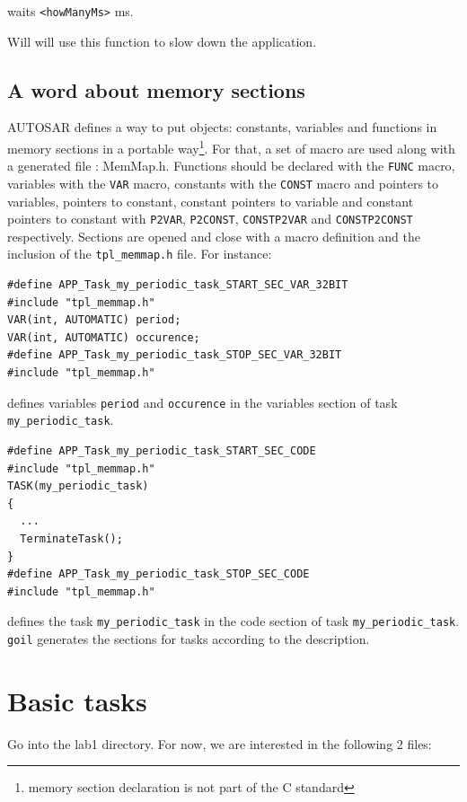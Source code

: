 \documentclass[11pt]{article}
\newcommand{\unixcl}[1]{\texttt{\fcolorbox{black}{gray!20}{#1}}}
\begin{document}
\unixcl{void delay(<howManyMs>);} waits \lstinline{<howManyMs>} ms. 

Will will use this function to slow down the application.

\subsection{A word about memory sections}

AUTOSAR defines a way to put objects: constants, variables and functions in memory sections in a portable way\footnote{memory section declaration is not part of the C standard}. For that, a set of macro are used along with a generated file : MemMap.h. Functions should be declared with the \lstinline{FUNC} macro, variables with the \lstinline{VAR} macro, constants with the \lstinline{CONST} macro and pointers to variables, pointers to constant, constant pointers to variable and constant pointers to constant with \lstinline{P2VAR}, \lstinline{P2CONST}, \lstinline{CONSTP2VAR} and \lstinline{CONSTP2CONST} respectively. Sections are opened and close with a macro definition and the inclusion of the \lstinline{tpl_memmap.h} file. For instance:

\begin{lstlisting}
#define APP_Task_my_periodic_task_START_SEC_VAR_32BIT
#include "tpl_memmap.h"
VAR(int, AUTOMATIC) period;
VAR(int, AUTOMATIC) occurence;
#define APP_Task_my_periodic_task_STOP_SEC_VAR_32BIT
#include "tpl_memmap.h"
\end{lstlisting}

defines variables \lstinline{period} and \lstinline{occurence} in the variables section of task \lstinline{my_periodic_task}.

\begin{lstlisting}
#define APP_Task_my_periodic_task_START_SEC_CODE
#include "tpl_memmap.h"
TASK(my_periodic_task)
{
  ...
  TerminateTask();
}
#define APP_Task_my_periodic_task_STOP_SEC_CODE
#include "tpl_memmap.h"
\end{lstlisting}

defines the task \lstinline{my_periodic_task} in the code section of task \lstinline{my_periodic_task}. \lstinline{goil} generates the sections for tasks according to the description.

\section{Basic tasks}

Go into the lab1 directory. For now, we are interested in the following 2 files:
\end{document}
